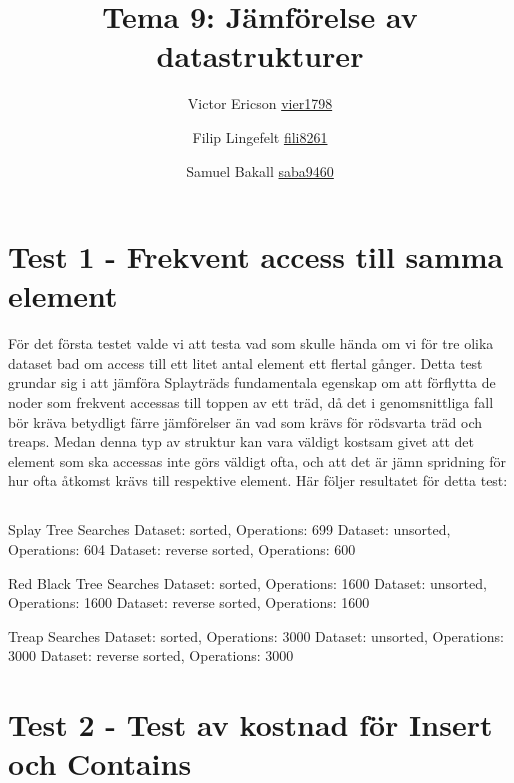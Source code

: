 \documentclass[a4paper,10pt,oneside]{article}
\title{Tema 9: Jämförelse av datastrukturer}
\author{Victor Ericson \url{vier1798} \and Filip Lingefelt \url{fili8261} \and Samuel Bakall \url{saba9460}}
\begin{document}
    \maketitle


    \section{Test 1 - Frekvent access till samma element}
    För det första testet valde vi att testa vad som skulle hända om vi för tre olika dataset bad om access till ett litet antal element ett flertal gånger. Detta test grundar sig i att jämföra Splayträds fundamentala egenskap om att förflytta de noder som frekvent accessas till toppen av ett träd, då det i genomsnittliga fall bör kräva betydligt färre jämförelser än vad som krävs för rödsvarta träd och treaps. Medan denna typ av struktur kan vara väldigt kostsam givet att det element som ska accessas inte görs väldigt ofta, och att det är jämn spridning för hur ofta åtkomst krävs till respektive element. Här följer resultatet för detta test:

    \subsection{}

    Splay Tree Searches
    Dataset: sorted, Operations: 699
    Dataset: unsorted, Operations: 604
    Dataset: reverse sorted, Operations: 600

    Red Black Tree Searches
    Dataset: sorted, Operations: 1600
    Dataset: unsorted, Operations: 1600
    Dataset: reverse sorted, Operations: 1600

    Treap Searches
    Dataset: sorted, Operations: 3000
    Dataset: unsorted, Operations: 3000
    Dataset: reverse sorted, Operations: 3000


    \section{Test 2 - Test av kostnad för Insert och Contains}

\end{document}
